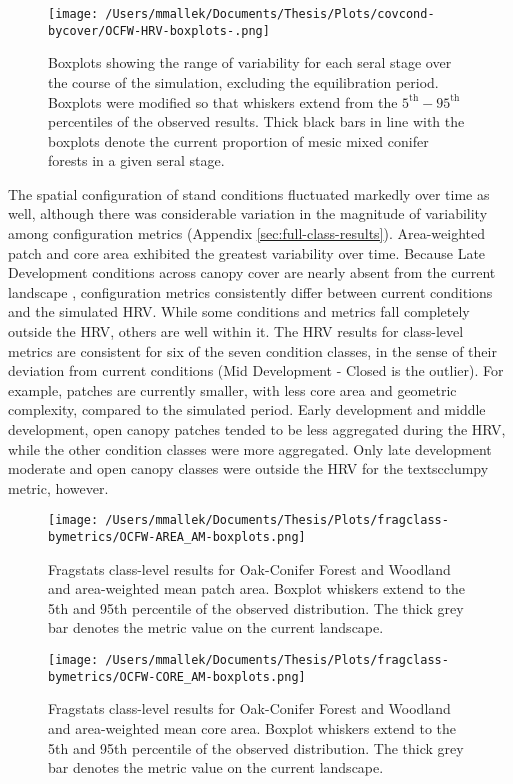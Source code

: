 \begin{figure}[!htbp]
  \centering
    \texttt{[image: /Users/mmallek/Documents/Thesis/Plots/covcond-bycover/OCFW-HRV-boxplots-.png]}
  \caption{Boxplots showing the range of variability for each seral stage over the course of the simulation, excluding the equilibration period. Boxplots were modified so that whiskers extend from the $5^{\text{th}} - 95^{\text{th}}$ percentiles of the observed results. Thick black bars in line with the boxplots denote the current proportion of mesic mixed conifer forests in a given seral stage.} 
  \label{fig:covcond_ocfw_boxplots}
\end{figure}

The spatial configuration of stand conditions fluctuated markedly over time as well, although there was considerable variation in the magnitude of variability among configuration metrics (Appendix \ref{sec:full-class-results}). Area-weighted patch and core area exhibited the greatest variability over time. Because Late Development conditions across canopy cover are nearly absent from the current landscape , configuration metrics consistently differ between current conditions and the simulated HRV. While some conditions and metrics fall completely outside the HRV, others are well within it. The HRV results for class-level metrics are consistent for six of the seven condition classes, in the sense of their deviation from current conditions (Mid Development - Closed is the outlier). For example, patches are currently smaller, with less core area and geometric complexity, compared to the simulated period. Early development and middle development, open canopy patches tended to be less aggregated during the HRV, while the other condition classes were more aggregated. Only late development moderate and open canopy classes were outside the HRV for the textsc{clumpy} metric, however.


\begin{figure}[!htbp]
\centering
    \texttt{[image: /Users/mmallek/Documents/Thesis/Plots/fragclass-bymetrics/OCFW-AREA\_AM-boxplots.png]}
  \caption{Fragstats class-level results for Oak-Conifer Forest and Woodland and area-weighted mean patch area. Boxplot whiskers extend to the 5th and 95th percentile of the observed distribution. The thick grey bar denotes the metric value on the current landscape.}
  \label{fig:ocfw_areaam}
\end{figure}


\begin{figure}[!htbp]
\centering
    \texttt{[image: /Users/mmallek/Documents/Thesis/Plots/fragclass-bymetrics/OCFW-CORE\_AM-boxplots.png]}
  \caption{Fragstats class-level results for Oak-Conifer Forest and Woodland and area-weighted mean core area. Boxplot whiskers extend to the 5th and 95th percentile of the observed distribution. The thick grey bar denotes the metric value on the current landscape.}
  \label{fig:ocfw_coream}
\end{figure}


